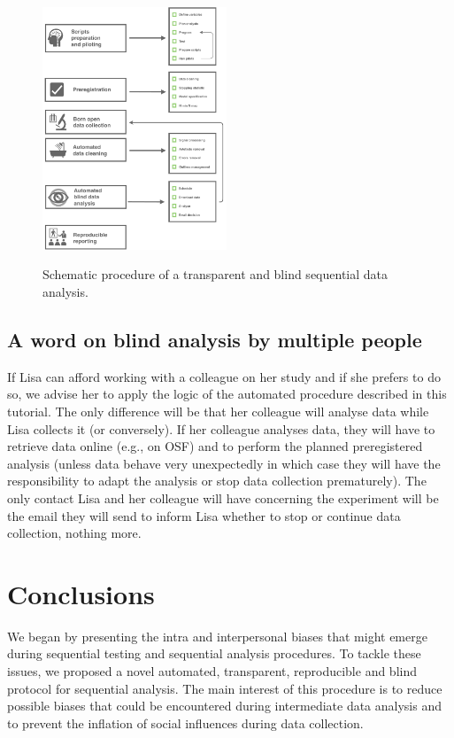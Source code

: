 \documentclass[a4paper,jou,natbib,floatsintext,donotrepeattitle]{apa6}
\begin{document}
\begin{figure}[H]
  \caption{Schematic procedure of a transparent and blind sequential data analysis.}
  \centering
  \includegraphics[width=0.49\textwidth]{figures/safeseqan.pdf}
  \label{fig:safeseqan}
\end{figure}

\subsection{A word on blind analysis by multiple people}

If Lisa can afford working with a colleague on her study and if she prefers to do so, we advise her to apply the logic of the automated procedure described in this tutorial. The only difference will be that her colleague will analyse data while Lisa collects it (or conversely). If her colleague analyses data, they will have to retrieve data online (e.g., on OSF) and to perform the planned preregistered analysis (unless data behave very unexpectedly in which case they will have the responsibility to adapt the analysis or stop data collection prematurely). The only contact Lisa and her colleague will have concerning the experiment will be the email they will send to inform Lisa whether to stop or continue data collection, nothing more.

\section{Conclusions}

We began by presenting the intra and interpersonal biases that might emerge during sequential testing and sequential analysis procedures. To tackle these issues, we proposed a novel automated, transparent, reproducible and blind protocol for sequential analysis. The main interest of this procedure is to reduce possible biases that could be encountered during intermediate data analysis and to prevent the inflation of social influences during data collection.
\end{document}
